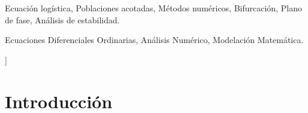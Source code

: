 \documentclass[a4paper,10pt,twocolumn]{article}
\begin{document}
\begin{keywords}
	Ecuación logística,
	Poblaciones acotadas,
	Métodos numéricos,
	Bifurcación,
	Plano de fase,
	Análisis de estabilidad.
\end{keywords}

\begin{topics}
	Ecuaciones Diferenciales Ordinarias, Análisis Numérico, Modelación Matemática.
\end{topics}


\vspace{0.8cm}
]




\section{Introducción}\label{sec:intro}

\end{document}
